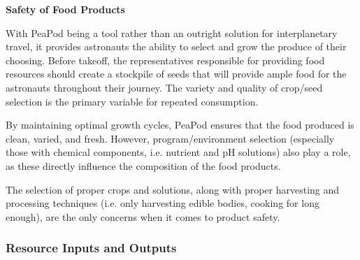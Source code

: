 \documentclass{report}
\begin{document}

\textbf{Safety of Food Products}
\label{sec:safety-products}




With PeaPod being a tool rather than an outright solution for interplanetary travel, it provides astronauts the ability to select and grow the produce of their choosing. Before takeoff, the representatives responsible for providing food resources should create a stockpile of seeds that will provide ample food for the astronauts throughout their journey. The variety and quality of crop/seed selection is the primary variable for repeated consumption.

By maintaining optimal growth cycles, PeaPod ensures that the food produced is clean, varied, and fresh. However, program/environment selection (especially those with chemical components, i.e. nutrient and pH solutions) also play a role, as these directly influence the composition of the food products.

The selection of proper crops and solutions, along with proper harvesting and processing techniques (i.e. only harvesting edible bodies, cooking for long enough), are the only concerns when it comes to product safety.


\newpage

\subsubsection{Resource Inputs and Outputs}
\label{sec:resource}

\end{document}
